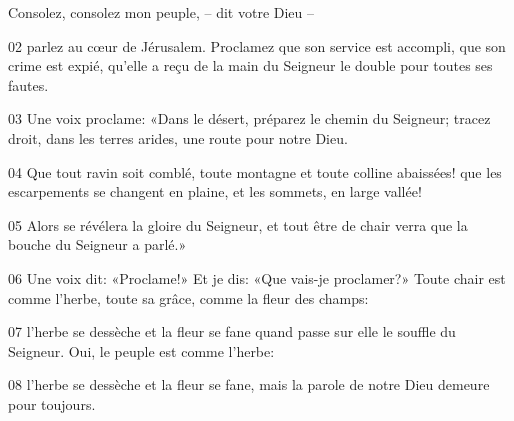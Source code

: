 Consolez, consolez mon peuple, – dit votre Dieu –

02 parlez au cœur de Jérusalem. Proclamez que son service est accompli, que son crime est expié, qu’elle a reçu de la main du Seigneur le double pour toutes ses fautes.

03 Une voix proclame: «Dans le désert, préparez le chemin du Seigneur; tracez droit, dans les terres arides, une route pour notre Dieu.

04 Que tout ravin soit comblé, toute montagne et toute colline abaissées! que les escarpements se changent en plaine, et les sommets, en large vallée!

05 Alors se révélera la gloire du Seigneur, et tout être de chair verra que la bouche du Seigneur a parlé.»

06 Une voix dit: «Proclame!» Et je dis: «Que vais-je proclamer?» Toute chair est comme l’herbe, toute sa grâce, comme la fleur des champs:

07 l’herbe se dessèche et la fleur se fane quand passe sur elle le souffle du Seigneur. Oui, le peuple est comme l’herbe:

08 l’herbe se dessèche et la fleur se fane, mais la parole de notre Dieu demeure pour toujours.